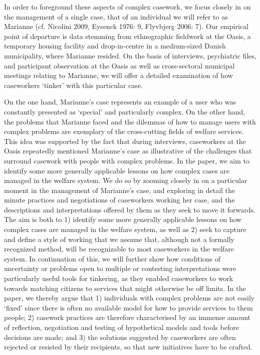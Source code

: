 \par
In order to foreground these aspects of complex casework, we focus closely in on the management of a single case, that of an individual we will refer to as Marianne (cf. Nicolini 2009, Eysenck 1976: 9, Flyvbjerg 2006: 7). Our empirical point of departure is data stemming from ethnographic fieldwork at the Oasis, a temporary housing facility and drop-in-centre in a medium-sized Danish municipality, where Marianne resided. On the basis of interviews, psychiatric files, and participant observation at the Oasis as well as cross-sectoral municipal meetings relating to Marianne, we will offer a detailed examination of how caseworkers ‘tinker’ with this particular case.
\par
On the one hand, Marianne’s case represents an example of a user who was constantly presented as ‘special’ and particularly complex. On the other hand, the problems that Marianne faced and the dilemmas of how to manage users with complex problems are exemplary of the cross-cutting fields of welfare services. This idea was supported by the fact that during interviews, caseworkers at the Oasis repeatedly mentioned Marianne’s case as illustrative of the challenges that surround casework with people with complex problems. In the paper, we aim to identify some more generally applicable lessons on how complex cases are managed in the welfare system. We do so by zooming closely in on a particular moment in the management of Marianne’s case, and exploring in detail the minute practices and negotiations of caseworkers working her case, and the descriptions and interpretations offered by them as they seek to move it forwards. The aim is both to 1) identify some more generally applicable lessons on how complex cases are managed in the welfare system, as well as 2) seek to capture and define a style of working that we assume that, although not a formally recognized method, will be recognizable to most caseworkers in the welfare system. In continuation of this, we will further show how conditions of uncertainty or problems open to multiple or contesting interpretations were particularly useful tools for tinkering, as they enabled caseworkers to work towards matching citizens to services that might otherwise be off limits. In the paper, we thereby argue that 1) individuals with complex problems are not easily ‘fixed’ since there is often no available model for how to provide services to them people; 2) casework practices are therefore characterised by an immense amount of reflection, negotiation and testing of hypothetical models and tools before decisions are made; and 3) the solutions suggested by caseworkers are often rejected or resisted by their recipients, so that new initiatives have to be crafted.

